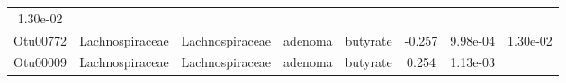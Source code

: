 \documentclass[11pt,]{article}
\begin{document}
\begin{longtable}[]{@{}cccccccc@{}}
\begin{minipage}[t]{0.08\columnwidth}
1.30e-02\strut
\end{minipage}\tabularnewline
\begin{minipage}[t]{0.08\columnwidth}\centering\strut
Otu00772\strut
\end{minipage} & \begin{minipage}[t]{0.15\columnwidth}\centering\strut
Lachnospiraceae\strut
\end{minipage} & \begin{minipage}[t]{0.15\columnwidth}\centering\strut
Lachnospiraceae\strut
\end{minipage} & \begin{minipage}[t]{0.08\columnwidth}\centering\strut
adenoma\strut
\end{minipage} & \begin{minipage}[t]{0.09\columnwidth}\centering\strut
butyrate\strut
\end{minipage} & \begin{minipage}[t]{0.07\columnwidth}\centering\strut
-0.257\strut
\end{minipage} & \begin{minipage}[t]{0.08\columnwidth}\centering\strut
9.98e-04\strut
\end{minipage} & \begin{minipage}[t]{0.08\columnwidth}\centering\strut
1.30e-02\strut
\end{minipage}\tabularnewline
\begin{minipage}[t]{0.08\columnwidth}\centering\strut
Otu00009\strut
\end{minipage} & \begin{minipage}[t]{0.15\columnwidth}\centering\strut
Lachnospiraceae\strut
\end{minipage} & \begin{minipage}[t]{0.15\columnwidth}\centering\strut
Lachnospiraceae\strut
\end{minipage} & \begin{minipage}[t]{0.08\columnwidth}\centering\strut
adenoma\strut
\end{minipage} & \begin{minipage}[t]{0.09\columnwidth}\centering\strut
butyrate\strut
\end{minipage} & \begin{minipage}[t]{0.07\columnwidth}\centering\strut
0.254\strut
\end{minipage} & \begin{minipage}[t]{0.08\columnwidth}\centering\strut
1.13e-03\strut
\end{minipage} & \begin{minipage}[t]{0.08\columnwidth}\centering\strut

\end{minipage}
\end{longtable}
\end{document}

